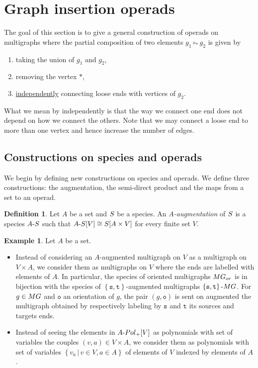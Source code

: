 \documentclass[11pt]{article}
\theoremstyle{definition}
\newtheorem{defi}[theo]{Definition}
\newtheorem{exam}[theo]{Example}
\numberwithin{equation}{section}
\newcommand{\set}[1]{\left\{#1\right\}}
\newcommand{\spe}[1]{\normalfont{\textsc{#1}}}
\newcommand{\comp}[1][\ast]{\circ_{#1}}
\newcommand{\ori}{\texttt{o}}
\newcommand{\MG}{\spe{MG}}
\newcommand{\Poly}{\spe{Pol}_+}
\newcommand{\augm}[2]{#1\text{-}#2}
\begin{document}
\section{Graph insertion operads}\label{sec_graph_operads}
The goal of this section is to give a general construction of operads on multigraphs where the partial 
composition of two elements $g_1\comp g_2$ is given by
\begin{enumerate}
    \item taking the union of $g_1$ and $g_2$,
    \item removing the vertex $\ast$,
    \item \underline{independently} connecting loose ends with vertices of $g_2$.
\end{enumerate}
What we mean by independently is that the way we connect one end does not depend on how we 
connect the others. Note that we may connect a loose end to more than one vertex and hence increase the number
of edges.




\subsection{Constructions on species and operads}\label{sec_constructions}

We begin by defining new constructions on species and operads. We define three constructions:
the augmentation, the semi-direct product and the maps from a set to an operad.

\begin{defi}
    Let $A$ be a set and $\spe{S}$ be a species. An {\em $A$-augmentation} of $\spe{S}$ is a species
     $\augm{A}{\spe{S}}$ such that $\augm{A}{\spe{S}}[V] \cong \spe{S}[A\times V]$ for every finite set $V$.
\end{defi}

\begin{exam}\label{ex_deform}
    Let $A$ be a set.
    \begin{itemize}
        \item Instead of considering an $A$-augmented multigraph on $V$ as a multigraph on $V\times A$, 
        we consider them as multigraphs on $V$ where the ends are labelled with elements of 
        $A$. In particular, the species of oriented multigraphs $\MG_{or}$ is in bijection with the species 
        of $\set{\mathtt{s,t}}$-augmented multigraphs $\augm{\set{\mathtt{s,t}}}{\MG}$. For $g\in\MG$ and 
        $\ori$ an orientation of $g$, the pair $(g,\ori)$ is sent on augmented the multigraph obtained by respectively 
        labeling by $\mathtt{s}$ and $\mathtt{t}$ its sources and targets ends.
        \item Instead of seeing the elements in $\augm{A}{\Poly}[V]$ as polynomials with set of variables the 
        couples $(v,a)\in V\times A$, we consider them as polynomials with set of variables 
        $\set{v_a\,|\,v\in V,a\in A}$ of elements of $V$ indexed by elements of $A$.
    \end{itemize}
\end{exam}
\end{document}
